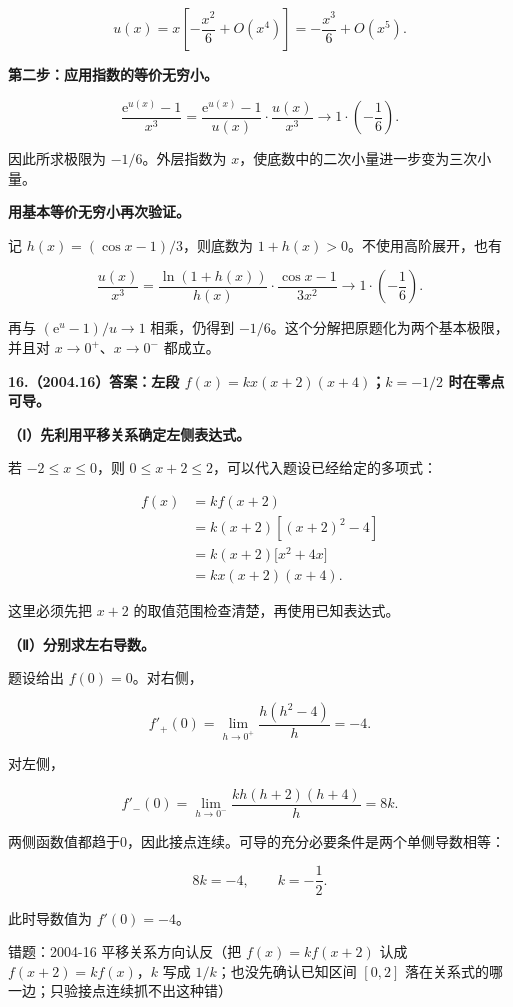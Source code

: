 \documentclass[UTF8,11pt,fontset=windows]{ctexart}
\begin{document}
$$
u(x)=x\left[-\frac{x^2}{6}+O(x^4)\right]
=-\frac{x^3}{6}+O(x^5).
$$

\textbf{第二步：应用指数的等价无穷小。}

$$
\frac{\mathrm e^{u(x)}-1}{x^3}
=\frac{\mathrm e^{u(x)}-1}{u(x)}\cdot\frac{u(x)}{x^3}
\longrightarrow1\cdot\left(-\frac16\right).
$$

因此所求极限为 $-1/6$。外层指数为 $x$，使底数中的二次小量进一步变为三次小量。

\textbf{用基本等价无穷小再次验证。}

记 $h(x)=(\cos x-1)/3$，则底数为 $1+h(x)>0$。不使用高阶展开，也有

$$
\frac{u(x)}{x^3}
=\frac{\ln(1+h(x))}{h(x)}\cdot\frac{\cos x-1}{3x^2}
\longrightarrow1\cdot\left(-\frac16\right).
$$

再与 $(\mathrm e^u-1)/u\to1$ 相乘，仍得到 $-1/6$。这个分解把原题化为两个基本极限，并且对 $x\to0^+$、$x\to0^-$ 都成立。

\clearpage

\textbf{16.（2004.16）答案：左段 $f(x)=kx(x+2)(x+4)$；$k=-1/2$ 时在零点可导。}

\textbf{（Ⅰ）先利用平移关系确定左侧表达式。}

若 $-2\le x\le0$，则 $0\le x+2\le2$，可以代入题设已经给定的多项式：

$$
\begin{aligned}
f(x)&=k f(x+2)\\
&=k(x+2)[(x+2)^2-4]\\
&=k(x+2)\bigl[x^2+4x\bigr]\\
&=kx(x+2)(x+4).
\end{aligned}
$$

这里必须先把 $x+2$ 的取值范围检查清楚，再使用已知表达式。

\textbf{（Ⅱ）分别求左右导数。}

题设给出 $f(0)=0$。对右侧，

$$
f'_+(0)=\lim_{h\to0^+}\frac{h(h^2-4)}h=-4.
$$

对左侧，

$$
f'_-(0)=\lim_{h\to0^-}\frac{kh(h+2)(h+4)}h=8k.
$$

两侧函数值都趋于0，因此接点连续。可导的充分必要条件是两个单侧导数相等：

$$
8k=-4,\qquad k=-\frac12.
$$

此时导数值为 $f'(0)=-4$。

\begingroup\color{gray}错题：2004-16 平移关系方向认反（把 $f(x)=kf(x+2)$ 认成 $f(x+2)=kf(x)$，$k$ 写成 $1/k$；也没先确认已知区间 $[0,2]$ 落在关系式的哪一边；只验接点连续抓不出这种错）\par\endgroup
\end{document}
